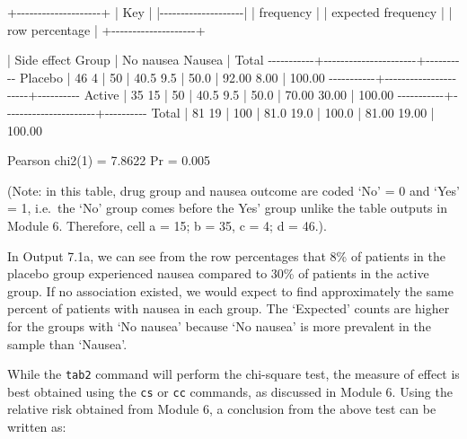 \documentclass[
]{memoir}
\newenvironment{Shaded}{\begin{snugshade}}{\end{snugshade}}
\newcommand{\NormalTok}[1]{#1}
\begin{document}
\begin{Shaded}
\begin{Highlighting}[]
\NormalTok{+{-}{-}{-}{-}{-}{-}{-}{-}{-}{-}{-}{-}{-}{-}{-}{-}{-}{-}{-}{-}+}
\NormalTok{| Key                |}
\NormalTok{|{-}{-}{-}{-}{-}{-}{-}{-}{-}{-}{-}{-}{-}{-}{-}{-}{-}{-}{-}{-}|}
\NormalTok{|     frequency      |}
\NormalTok{| expected frequency |}
\NormalTok{|   row percentage   |}
\NormalTok{+{-}{-}{-}{-}{-}{-}{-}{-}{-}{-}{-}{-}{-}{-}{-}{-}{-}{-}{-}{-}+}

\NormalTok{           |      Side effect}
\NormalTok{     Group | No nausea     Nausea |     Total}
\NormalTok{{-}{-}{-}{-}{-}{-}{-}{-}{-}{-}{-}+{-}{-}{-}{-}{-}{-}{-}{-}{-}{-}{-}{-}{-}{-}{-}{-}{-}{-}{-}{-}{-}{-}+{-}{-}{-}{-}{-}{-}{-}{-}{-}{-}}
\NormalTok{   Placebo |        46          4 |        50 }
\NormalTok{           |      40.5        9.5 |      50.0 }
\NormalTok{           |     92.00       8.00 |    100.00 }
\NormalTok{{-}{-}{-}{-}{-}{-}{-}{-}{-}{-}{-}+{-}{-}{-}{-}{-}{-}{-}{-}{-}{-}{-}{-}{-}{-}{-}{-}{-}{-}{-}{-}{-}{-}+{-}{-}{-}{-}{-}{-}{-}{-}{-}{-}}
\NormalTok{    Active |        35         15 |        50 }
\NormalTok{           |      40.5        9.5 |      50.0 }
\NormalTok{           |     70.00      30.00 |    100.00 }
\NormalTok{{-}{-}{-}{-}{-}{-}{-}{-}{-}{-}{-}+{-}{-}{-}{-}{-}{-}{-}{-}{-}{-}{-}{-}{-}{-}{-}{-}{-}{-}{-}{-}{-}{-}+{-}{-}{-}{-}{-}{-}{-}{-}{-}{-}}
\NormalTok{     Total |        81         19 |       100 }
\NormalTok{           |      81.0       19.0 |     100.0 }
\NormalTok{           |     81.00      19.00 |    100.00 }

\NormalTok{          Pearson chi2(1) =   7.8622   Pr = 0.005}
\end{Highlighting}
\end{Shaded}

(Note: in this table, drug group and nausea outcome are coded `No' = 0 and `Yes' = 1, i.e.~the `No' group comes before the Yes' group unlike the table outputs in Module 6. Therefore, cell a = 15; b = 35, c = 4; d = 46.).

In Output 7.1a, we can see from the row percentages that 8\% of patients in the placebo group experienced nausea compared to 30\% of patients in the active group. If no association existed, we would expect to find approximately the same percent of patients with nausea in each group. The `Expected' counts are higher for the groups with `No nausea' because `No nausea' is more prevalent in the sample than `Nausea'.

While the \texttt{tab2} command will perform the chi-square test, the measure of effect is best obtained using the \texttt{cs} or \texttt{cc} commands, as discussed in Module 6. Using the relative risk obtained from Module 6, a conclusion from the above test can be written as:
\end{document}
